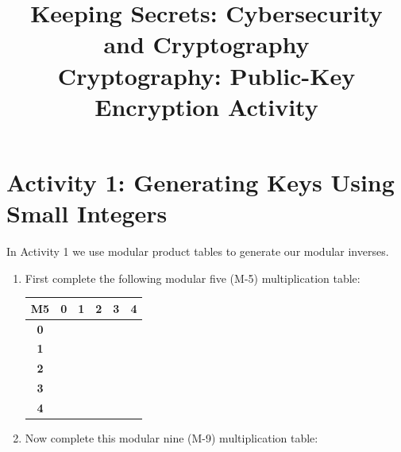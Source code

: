 \documentclass[11pt,a4paper]{article}
\title{Keeping Secrets: Cybersecurity and Cryptography\\
\large Cryptography: Public-Key Encryption Activity}
\author{}
\date{}
\begin{document}
\maketitle

\section*{Activity 1: Generating Keys Using Small Integers}

In Activity 1 we use modular product tables to generate our modular inverses.

\begin{enumerate}
    \item First complete the following modular five (M-5) multiplication table:
    
    \begin{center}
    \renewcommand{\arraystretch}{1.5}
    \begin{tabular}{|c|c|c|c|c|c|}
    \hline
    \textbf{M5} & \textbf{0} & \textbf{1} & \textbf{2} & \textbf{3} & \textbf{4} \\
    \hline
    \textbf{0} & \hspace{.6cm} &\hspace{.6cm} &\hspace{.6cm} &\hspace{.6cm} &\hspace{.6cm} \\
    \hline
    \textbf{1} & & & & & \\
    \hline
    \textbf{2} & & & & & \\
    \hline
    \textbf{3} & & & & & \\
    \hline
    \textbf{4} & & & & & \\
    \hline
    \end{tabular}
    \end{center}
    
    \vspace{1cm}
    
    \item Now complete this modular nine (M-9) multiplication table:
    

\end{enumerate}
\end{document}

